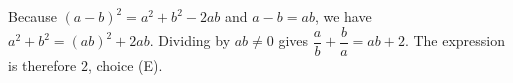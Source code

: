 Because $(a-b)^2=a^2+b^2-2ab$ and $a-b=ab$, we have $a^2+b^2=(ab)^2+2ab$. Dividing by $ab\ne0$ gives $\dfrac{a}{b}+\dfrac{b}{a}=ab+2$. The expression is therefore $\boxed2$, choice (E).
